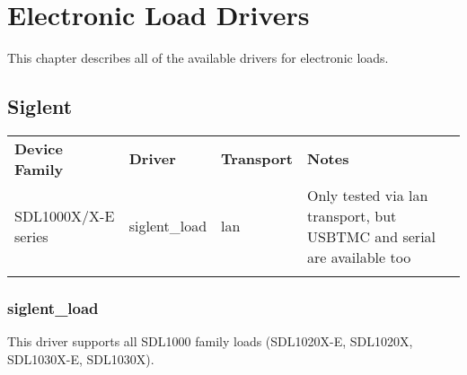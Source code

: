 \chapter{Electronic Load Drivers}
\label{sec:load-drivers}

This chapter describes all of the available drivers for electronic loads.

\section{Siglent}

\begin{tabularx}{16cm}{lllX}
\thickhline
\textbf{Device Family} & \textbf{Driver} & \textbf{Transport} & \textbf{Notes} \\
\thickhline
SDL1000X/X-E series & siglent\_load & lan & Only tested via lan transport, but USBTMC and serial are available too\\
\thickhline
\end{tabularx}

\subsection{siglent\_load}

This driver supports all SDL1000 family loads (SDL1020X-E, SDL1020X, SDL1030X-E, SDL1030X).
